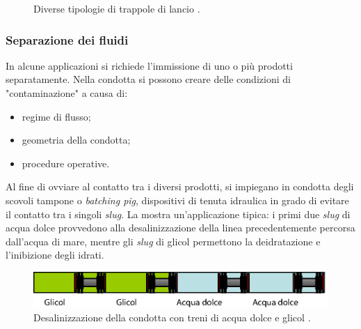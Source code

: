 \begin{figure}[htbp]
\caption{Diverse tipologie di trappole di lancio \parencite{williamson2015guide}.}
\label{fig:displacement-tools}
\end{figure} 
 
\subsubsection{Separazione dei fluidi}
In alcune applicazioni si richiede l'immissione di uno o più prodotti separatamente. Nella condotta si possono creare delle condizioni di "contaminazione" a causa di:
\begin{itemize}
	\item regime di flusso;
	\item geometria della condotta;
	\item procedure operative.
\end{itemize}
Al fine di ovviare al contatto tra i diversi prodotti, si impiegano in condotta degli scovoli tampone o \textit{batching pig}, dispositivi di tenuta idraulica in grado di evitare il contatto tra i singoli \textit{slug}. La  mostra un'applicazione tipica: i primi due \textit{slug} di acqua dolce provvedono alla desalinizzazione della linea precedentemente percorsa dall'acqua di mare, mentre gli \textit{slug} di glicol permettono la deidratazione e l'inibizione degli idrati.

\begin{figure}[htbp]
	\centering
	\includegraphics[width=\textwidth]{fig/pig/batching.eps}
	\caption{Desalinizzazione della condotta con treni di acqua dolce e glicol \parencite{davidson2002introduction}.}
	\label{fig:batching}
\end{figure}

